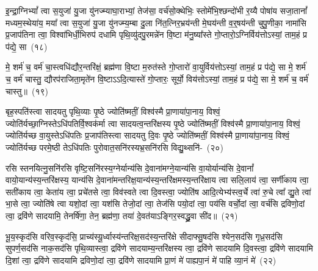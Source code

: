 {}

इ॒न्द्रा॒ग्नि\-भ्यां᳚ त्वा स॒युजा॑ यु॒जा यु॑नज्म्याघा॒राभ्यां॒ तेज॑सा॒ वर्च॑सो॒क्थेभिः॒ स्तोमे॑भि॒श्छन्दो॑भी र॒य्यै पोषा॑य सजा॒तानां᳚ मध्यम॒स्थेया॑य॒ मया᳚ त्वा स॒युजा॑ यु॒जा यु॑नज्म्य॒म्बा दु॒ला नि॑त॒त्निर॒भ्रय॑न्ती मे॒घय॑न्ती व॒र्॒\mbox{}षय॑न्ती चुपु॒णीका॒ नामा॑सि प्र॒जा\-प॑तिना त्वा॒ विश्वा॑भिर्धी॒भिरुप॑ दधामि पृथि॒व्यु॑दपु॒रमन्ने॑न वि॒ष्टा म॑नु॒ष्या᳚स्ते गो॒प्तारो॒\-ऽग्निर्विय॑त्तो\-ऽस्यां॒ ताम॒हं प्र प॑द्ये॒ सा~(१८)\ip

मे॒ शर्म॑ च॒ वर्म॑ चा॒स्त्वधि॑द्यौर॒न्तरि॑क्षं॒ ब्रह्म॑णा वि॒ष्टा म॒रुत॑स्ते गो॒प्तारो॑ वा॒युर्विय॑त्तो\-ऽस्यां॒ ताम॒हं प्र प॑द्ये॒ सा मे॒ शर्म॑ च॒ वर्म॑ चास्तु॒ द्यौरप॑राजिता॒मृते॑न वि॒ष्टा\-ऽऽ\-दि॒त्यास्ते॑ गो॒प्तारः॒ सूर्यो॒ विय॑त्तो\-ऽस्यां॒ ताम॒हं प्र प॑द्ये॒ सा मे॒ शर्म॑ च॒ वर्म॑ चास्तु॥~(१९)\ip

{\anuvakamend[{सा\-ऽष्टाच॑त्वारिꣳशच्च}]}

बृह॒स्पति॑स्त्वा सादयतु पृथि॒व्याः पृ॒ष्ठे ज्योति॑ष्मतीं॒ विश्व॑स्मै प्रा॒णाया॑पा॒नाय॒ विश्वं॒ ज्योति॑र्यच्छा॒ग्निस्ते\-ऽधि॑\-पतिर्वि॒श्वक॑र्मा त्वा सादयत्व॒न्त\-रि॑क्षस्य पृ॒ष्ठे ज्योति॑ष्मतीं॒ विश्व॑स्मै प्रा॒णाया॑पा॒नाय॒ विश्वं॒ ज्योति॑र्यच्छ वा॒युस्ते\-ऽधि॑\-पतिः प्र॒जा\-प॑तिस्त्वा सादयतु दि॒वः पृ॒ष्ठे ज्योति॑ष्मतीं॒ विश्व॑स्मै प्रा॒णाया॑पा॒नाय॒ विश्वं॒ ज्योति॑र्यच्छ परमे॒ष्ठी ते\-ऽधि॑\-पतिः पुरोवात॒सनि॑रस्यभ्र॒सनि॑रसि विद्यु॒थ्सनि॑-~(२०)\ip

रसि स्तनयित्नु॒सनि॑रसि वृष्टि॒सनि॑रस्य॒ग्नेर्यान्य॑सि दे॒वाना॑\-मग्ने॒यान्य॑सि वा॒योर्यान्य॑सि दे॒वानां᳚ वायो॒यान्य॑स्य॒न्त\-रि॑क्षस्य॒ यान्य॑सि दे॒वाना॑\-मन्तरिक्ष॒यान्य॑स्य॒न्तरि॑क्षमस्य॒न्तरि॑क्षाय त्वा सलि॒लाय॑ त्वा॒ सर्णी॑काय त्वा॒ सती॑काय त्वा॒ केता॑य त्वा॒ प्रचे॑तसे त्वा॒ विव॑स्वते त्वा दि॒वस्त्वा॒ ज्योति॑ष आदि॒त्येभ्य॑स्त्व॒र्चे त्वा॑ रु॒चे त्वा᳚ द्यु॒ते त्वा॑ भा॒से त्वा॒ ज्योति॑षे त्वा यशो॒दां त्वा॒ यश॑सि तेजो॒दां त्वा॒ तेज॑सि पयो॒दां त्वा॒ पय॑सि वर्चो॒दां त्वा॒ वर्च॑सि द्रविणो॒दां त्वा॒ द्रवि॑णे सादयामि॒ तेनर्\mbox{}षि॑णा॒ तेन॒ ब्रह्म॑णा॒ तया॑ दे॒वत॑या\-ऽ\-ङ्गिर॒स्वद्ध्रु॒वा सी॑द॥~(२१)\ip

{\anuvakamend[{वि॒द्यु॒थ्सनि॑र्द्यु॒त्वैका॒न्नत्रि॒ꣳ॒शच्च॑}]}

भू॒य॒स्कृद॑सि वरिव॒स्कृद॑सि॒ प्राच्य॑स्यू॒र्ध्वास्य॑न्तरिक्ष॒सद॑स्य॒न्त\-रि॑क्षे सीदाफ्सु॒षद॑सि श्येन॒सद॑सि गृध्र॒सद॑सि सुपर्ण॒सद॑सि नाक॒सद॑सि पृथि॒व्यास्त्वा॒ द्रवि॑णे सादयाम्य॒न्त\-रि॑क्षस्य त्वा॒ द्रवि॑णे सादयामि दि॒वस्त्वा॒ द्रवि॑णे सादयामि दि॒शां त्वा॒ द्रवि॑णे सादयामि द्रविणो॒दां त्वा॒ द्रवि॑णे सादयामि प्रा॒णं मे॑ पाह्यपा॒नं मे॑ पाहि व्या॒नं मे॑~(२२)\ip

